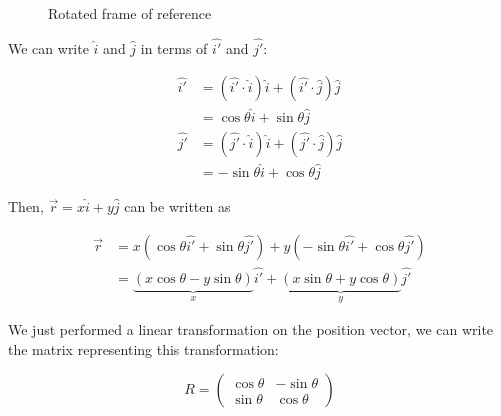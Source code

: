\documentclass[10pt]{extarticle}
\begin{document}
\begin{figure}[H]
    \caption{Rotated frame of reference}
    \label{fig:rotated_frame}
\end{figure}

We can write $\hat{i}$ and $\hat{j}$ in terms of $\hat{i'}$ and $\hat{j'}$:

\begin{align*}
    \hat{i'} & = \left( \hat{i'} \cdot \hat{i} \right) \hat{i}
    + \left( \hat{i'} \cdot \hat{j} \right) \hat{j}            \\
             & = \cos \theta \hat{i} + \sin \theta \hat{j}     \\
    \hat{j'} & = \left( \hat{j'} \cdot \hat{i} \right) \hat{i}
    + \left( \hat{j'} \cdot \hat{j} \right) \hat{j}            \\
             & = -\sin \theta \hat{i} + \cos \theta \hat{j}
\end{align*}

Then, $\vec{r} = x \hat{i} + y \hat{j}$ can be written as

\begin{align*}
    \vec{r} & = x \left( \cos \theta \hat{i'} + \sin \theta \hat{j'} \right)  + y \left( -\sin \theta \hat{i'} + \cos \theta \hat{j'} \right) \\
            & = \underbrace{ (x \cos \theta - y \sin \theta) }_x \hat{i'}
    + \underbrace{ (x \sin \theta + y \cos \theta) }_y \hat{j'}
\end{align*}

We just performed a linear transformation on the position vector,
we can write the matrix representing this transformation:

$$
    R = \begin{pmatrix}
        \cos \theta & -\sin \theta \\
        \sin \theta & \cos \theta
    \end{pmatrix}
$$
\end{document}
